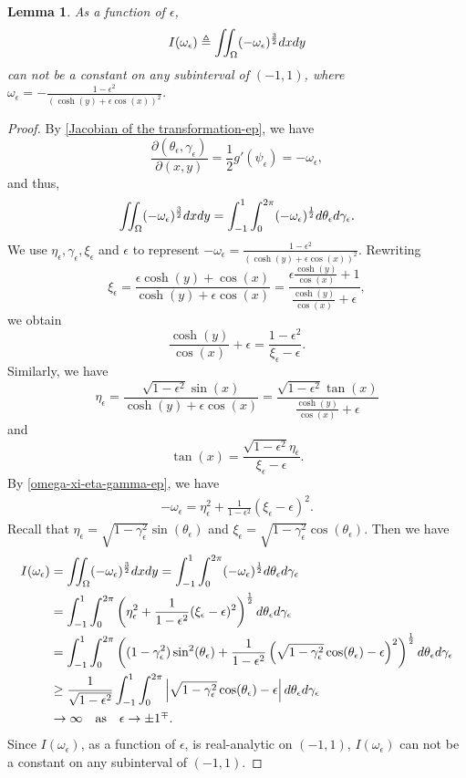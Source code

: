 \documentclass[1 [leqno, 11pt]{amsart}
\numberwithin{equation}{section}
\let\ep=\epsilon
\newtheorem{lemma}[Theorem]{Lemma}
\begin{document}
\begin{CJK*}{GBK}{song}
\begin{lemma}\label{intOmega2} As a function of $\ep$,
\begin{align}\label{additional functional-2deuler}I(\omega_\ep)\triangleq\iint_{\Omega} (-\omega_\ep)^{3\over2} dxdy\end{align}
can  not be a constant on any subinterval of $(-1, 1)$, where  $\omega_\ep = - \frac{1 - \ep^2}{(\cosh(y) + \ep \cos(x))^2}$.
\end{lemma}
\begin{proof}
By \eqref{Jacobian of the transformation-ep}, we have  $$\frac{\partial (\theta_\ep, \gamma_\ep)}{\partial (x, y)} =\frac{1}{2} g'(\psi_\ep) = - \omega_\ep,$$
and thus,
\begin{align*}
\iint_{\Omega} (-\omega_\ep)^{3\over2}  dxdy = \int_{-1}^1 \int_{0}^{2\pi} (-\omega_\ep)^{1\over2}  d \theta_\ep d\gamma_\ep.
\end{align*}
We use $\eta_\ep, \gamma_\ep, \xi_\ep$ and $\ep$ to represent $-\omega_\ep = \frac{1 - \ep^2}{(\cosh(y) + \ep \cos(x))^2}$. Rewriting $$\xi_\ep = \frac{\ep \cosh(y) + \cos(x)}{\cosh(y) + \ep \cos(x)} = \frac{\ep \frac{\cosh(y)}{\cos(x)} + 1}{\frac{\cosh(y)}{\cos(x)} + \ep},$$
we obtain $$\frac{\cosh(y)}{\cos(x)} + \ep = \frac{1-\ep^2}{\xi_\ep - \ep}.$$
Similarly, we have
$$\eta_\ep = \frac{\sqrt{1-\ep^2} \sin(x)}{\cosh(y) + \ep \cos(x)} = \frac{\sqrt{1-\ep^2} \tan(x) }{\frac{\cosh(y)}{\cos(x)} + \ep}$$
and $$\tan(x) = \frac{\sqrt{1-\ep^2} \eta_\ep }{\xi_\ep - \ep}.$$
\fi
By \eqref{omega-xi-eta-gamma-ep}, we have
\begin{align*}
-\omega_\ep
 = \eta_\ep^2 + \frac{1}{1-\ep^2} (\xi_\ep - \ep)^2.
\end{align*}
Recall that $
\eta_\ep = \sqrt{1-\gamma_\ep^2} \sin(\theta_\ep)$ and $
\xi_\ep = \sqrt{1-\gamma_\ep^2} \cos(\theta_\ep)$. Then
we have
\begin{align*}
I(\omega_\ep)&=\iint_{\Omega} (-\omega_\ep)^{3\over2}  dxdy
 = \int_{-1}^1 \int_{0}^{2\pi} (-\omega_\ep)^{1\over2}  d \theta_\ep d\gamma_\ep \\
& = \int_{-1}^1 \int_{0}^{2\pi} \left(\eta_\ep^2 + \frac{1}{1-\ep^2} (\xi_\ep - \ep)^2\right)^{1\over2} d \theta_\ep d\gamma_\ep \\
& = \int_{-1}^1 \int_{0}^{2\pi} \left((1-\gamma_\ep^2) \sin^2(\theta_\ep) + \frac{1}{1-\ep^2} \left( \sqrt{1-\gamma_\ep^2} \cos(\theta_\ep) -\ep \right)^2\right)^{1\over2}  d \theta_\ep d\gamma_\ep \\
& \geq\frac{1}{\sqrt{1-\ep^2}}\int_{-1}^1 \int_{0}^{2\pi} \left| \sqrt{1-\gamma_\ep^2} \cos(\theta_\ep) -\ep \right|  d \theta_\ep d\gamma_\ep
\\
&\to\infty \quad\text{as}\quad \ep\to\pm1^{\mp}.
\end{align*}
Since $I(\omega_\ep)$, as a function of $\ep$, is real-analytic on $(-1,1)$, $I(\omega_\ep)$ can  not be a constant on any subinterval of $(-1, 1)$.
\end{proof}


\end{CJK*}
\end{document}
